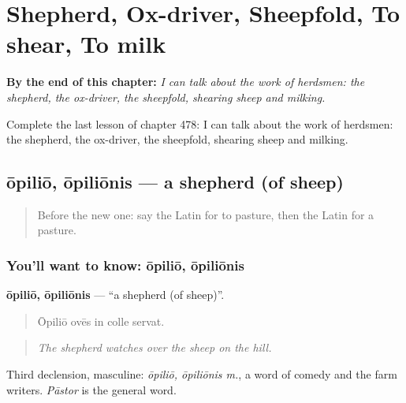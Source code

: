 
\chapter{Shepherd, Ox-driver, Sheepfold, To shear, To milk}
\label{ch:la-shepherd-ox-driver-sheepfold-to-shear-to-milk}

\begin{chapteropening}
\textbf{By the end of this chapter:} \emph{I can talk about the work of herdsmen: the shepherd, the ox-driver, the sheepfold, shearing sheep and milking.}

Complete the last lesson of chapter 478: I can talk about the work of herdsmen: the shepherd, the ox-driver, the sheepfold, shearing sheep and milking.
\end{chapteropening}

\section[ōpiliō, ōpiliōnis]{ōpiliō, ōpiliōnis — a shepherd (of sheep)}

\label{lesson:LA-C478-opilio}



\begin{quote}
Before the new one: say the Latin for to pasture, then the Latin for a pasture.
\end{quote}

\subsection*{You'll want to know: ōpiliō, ōpiliōnis}
\textbf{ōpiliō, ōpiliōnis} — \textquotedblleft{}a shepherd (of sheep)\textquotedblright{}.

\begin{quote}
Ōpiliō ovēs in colle servat.
\end{quote}

\begin{quote}
\emph{The shepherd watches over the sheep on the hill.}
\end{quote}

Third declension, masculine: \emph{ōpiliō, ōpiliōnis m.}, a word of comedy and the farm writers. \emph{Pāstor} is the general word.

